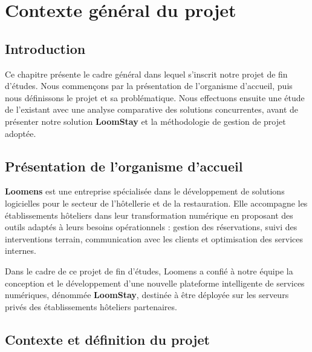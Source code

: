 
\chapter{Contexte général du projet}
\label{chap:contexte}

\section*{Introduction}

Ce chapitre présente le cadre général dans lequel s'inscrit notre projet de fin d'études. Nous commençons par la présentation de l'organisme d'accueil, puis nous définissons le projet et sa problématique. Nous effectuons ensuite une étude de l'existant avec une analyse comparative des solutions concurrentes, avant de présenter notre solution \textbf{LoomStay} et la méthodologie de gestion de projet adoptée.

\section{Présentation de l'organisme d'accueil}
\label{sec:organisme}

\textbf{Loomens} est une entreprise spécialisée dans le développement de solutions logicielles pour le secteur de l'hôtellerie et de la restauration. Elle accompagne les établissements hôteliers dans leur transformation numérique en proposant des outils adaptés à leurs besoins opérationnels : gestion des réservations, suivi des interventions terrain, communication avec les clients et optimisation des services internes.

Dans le cadre de ce projet de fin d'études, Loomens a confié à notre équipe la conception et le développement d'une nouvelle plateforme intelligente de services numériques, dénommée \textbf{LoomStay}, destinée à être déployée sur les serveurs privés des établissements hôteliers partenaires.

\section{Contexte et définition du projet}
\label{sec:definition_projet}

